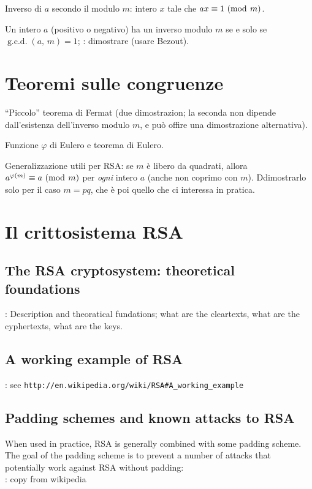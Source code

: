 \documentclass[pdflatex,11pt,a4paper,oneside]{article}
\renewcommand{\phi}{\varphi}
\renewcommand{\iff}[0]{se e solo se }
\newcommand{\XXX}[1][XXX]{\text{\bfseries{\color{red}{\emph{#1}}}}}
\newcommand{\TODO}[0]{\XXX[TODO]}
\newcommand{\congruent}[0]{\equiv}
\newcommand{\mmodop}[0]{\ensuremath{\operatorname{mod}}}
\newcommand{\mmod}[1]{\ensuremath{\allowbreak\ (\mmodop\:{#1})}}
\newcommand{\gcdop}[0]{\ensuremath{\operatorname{g.c.d.}}}
\newcommand{\xgcd}[1]{\ensuremath{\gcdop\left({#1}\right)}}
\renewcommand{\gcd}[2]{\xgcd{{#1},\,{#2}}}
\numberwithin{equation}{section}
\begin{document}
Inverso di $a$ secondo il modulo $m$: intero $x$ tale che
$ax \congruent 1 \mmod m$.

Un intero $a$ (positivo o negativo) ha un inverso modulo $m$ \iff
$\gcd{a}{m} = 1$; \TODO: dimostrare (usare Bezout).


\section{Teoremi sulle congruenze}

``Piccolo'' teorema di Fermat (due dimostrazion; la seconda non dipende
dall'esistenza dell'inverso modulo $m$, e pu\`o offire una dimostrazione
alternativa).

Funzione $\phi$ di Eulero e teorema di Eulero.

Generalizzazione utili per RSA: se $m$ \`e libero da quadrati, allora
$a^{\phi(m)} \congruent a \mmod m$ per \emph{ogni} intero $a$ (anche
non coprimo con $m$).  Ddimostrarlo solo per il caso $m = pq$, che \`e
poi quello che ci interessa in pratica.


\section{Il crittosistema RSA}

\subsection{The RSA cryptosystem: theoretical foundations}

\TODO: Description and theoratical fundations; what are the cleartexts,
what are the cyphertexts, what are the keys.

\subsection{A working example of RSA}

\TODO: see \verb+http://en.wikipedia.org/wiki/RSA#A_working_example+

\subsection{Padding schemes and known attacks to RSA}

When used in practice, RSA is generally combined with some padding scheme.
The goal of the padding scheme is to prevent a number of attacks that
potentially work against RSA without padding:\\
\TODO: copy from wikipedia
\end{document}
